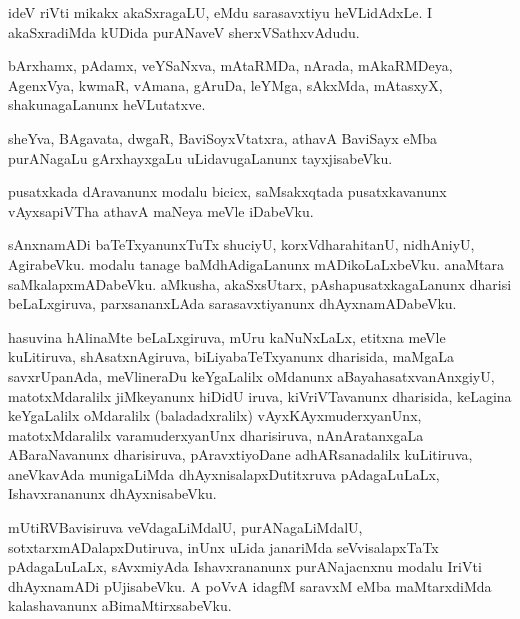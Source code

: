 \documentclass{article}
\begin{document}
\begin{mn}
ideV  riVti  mikakx  akaSxragaLU,  eMdu  sarasavxtiyu  heVLidAdxLe.  I  akaSxradiMda  kUDida  purANaveV  sherxVSathxvAdudu.
\end{mn}

\begin{mn}
bArxhamx,  pAdamx,  veYSaNxva,  mAtaRMDa,  nArada,  mAkaRMDeya,  AgenxVya,  kwmaR,  vAmana,  gAruDa,  leYMga,  sAkxMda,  mAtasxyX,  
shakunagaLanunx  heVLutatxve.
\end{mn}

\begin{mn}
sheYva,  BAgavata,  dwgaR,  BaviSoyxVtatxra,  athavA  BaviSayx  eMba  purANagaLu  gArxhayxgaLu  uLidavugaLanunx  tayxjisabeVku.
\end{mn}

\begin{mn}
pusatxkada  dAravanunx  modalu  bicicx,  saMsakxqtada  pusatxkavanunx  vAyxsapiVTha  athavA  maNeya  meVle  iDabeVku.
\end{mn}

\begin{mn}
sAnxnamADi  baTeTxyanunxTuTx  shuciyU,  korxVdharahitanU,  nidhAniyU,  AgirabeVku.  modalu  tanage  baMdhAdigaLanunx  mADikoLaLxbeVku.  anaMtara  
saMkalapxmADabeVku.  aMkusha,  akaSxsUtarx,  pAshapusatxkagaLanunx  dharisi  beLaLxgiruva,  parxsananxLAda  sarasavxtiyanunx  dhAyxnamADabeVku.  
\end{mn}

\begin{mn}
hasuvina  hAlinaMte  beLaLxgiruva,  mUru  kaNuNxLaLx,  etitxna  meVle  kuLitiruva,  shAsatxnAgiruva,  biLiyabaTeTxyanunx  dharisida,  maMgaLa  
savxrUpanAda,  meVlineraDu  keYgaLalilx  oMdanunx  aBayahasatxvanAnxgiyU,  matotxMdaralilx  jiMkeyanunx  hiDidU  iruva,  kiVriVTavanunx  
dharisida,  keLagina  keYgaLalilx  oMdaralilx (baladadxralilx) vAyxKAyxmuderxyanUnx,  matotxMdaralilx  varamuderxyanUnx  dharisiruva,  
nAnAratanxgaLa  ABaraNavanunx  dharisiruva,  pAravxtiyoDane  adhARsanadalilx  kuLitiruva,  aneVkavAda  munigaLiMda  dhAyxnisalapxDutitxruva  
pAdagaLuLaLx,  Ishavxrananunx  dhAyxnisabeVku.
\end{mn}

\begin{mn}
mUtiRVBavisiruva  veVdagaLiMdalU,  purANagaLiMdalU,  sotxtarxmADalapxDutiruva,  inUnx  uLida  janariMda  seVvisalapxTaTx  pAdagaLuLaLx,  
sAvxmiyAda  Ishavxrananunx  purANajacnxnu  modalu  IriVti  dhAyxnamADi  pUjisabeVku.  A  poVvA  idagfM  saravxM  eMba  maMtarxdiMda  
kalashavanunx aBimaMtirxsabeVku.
\end{mn}
\end{document}
